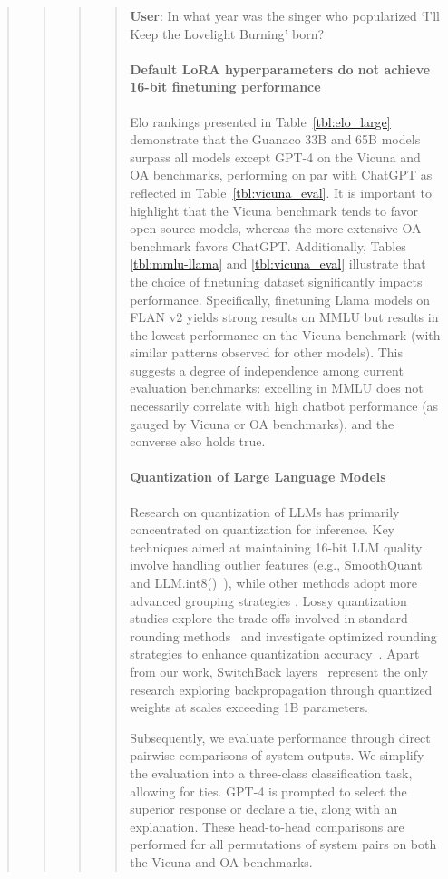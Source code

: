\begin{quote}
\begin{quote}
\begin{quote}
\begin{quote}
     \textbf{User}: In what year was the singer who popularized `I'll Keep the Lovelight Burning' born?  

\paragraph{Default LoRA hyperparameters do not achieve 16-bit finetuning performance}

Elo rankings presented in Table~\ref{tbl:elo_large} demonstrate that the {Guanaco} 33B and 65B models surpass all models except GPT-4 on the Vicuna and OA benchmarks, performing on par with ChatGPT as reflected in Table~\ref{tbl:vicuna_eval}. It is important to highlight that the Vicuna benchmark tends to favor open-source models, whereas the more extensive OA benchmark favors ChatGPT. Additionally, Tables \ref{tbl:mmlu-llama} and \ref{tbl:vicuna_eval} illustrate that the choice of finetuning dataset significantly impacts performance. Specifically, finetuning Llama models on FLAN v2 yields strong results on MMLU but results in the lowest performance on the Vicuna benchmark (with similar patterns observed for other models). This suggests a degree of independence among current evaluation benchmarks: excelling in MMLU does not necessarily correlate with high chatbot performance (as gauged by Vicuna or OA benchmarks), and the converse also holds true.

\paragraph{Quantization of Large Language Models} Research on quantization of LLMs has primarily concentrated on quantization for inference. Key techniques aimed at maintaining 16-bit LLM quality involve handling outlier features (e.g., SmoothQuant~\citep{xiao2022smoothquant} and LLM.int8()~\citep{dettmers2022llm}), while other methods adopt more advanced grouping strategies \citep{park2022nuqmm, yao2022zeroquant}. Lossy quantization studies explore the trade-offs involved in standard rounding methods~\citep{dettmers2022case,zeng2022glm,pope2022efficiently} and investigate optimized rounding strategies to enhance quantization accuracy~\citep{frantar2022gptq}. Apart from our work, SwitchBack layers~\citep{wortsman2023stable} represent the only research exploring backpropagation through quantized weights at scales exceeding 1B parameters.

Subsequently, we evaluate performance through direct pairwise comparisons of system outputs. We simplify the evaluation into a three-class classification task, allowing for ties. GPT-4 is prompted to select the superior response or declare a tie, along with an explanation. These head-to-head comparisons are performed for all permutations of system pairs on both the Vicuna and OA benchmarks.


\end{quote}
\end{quote}
\end{quote}
\end{quote}
